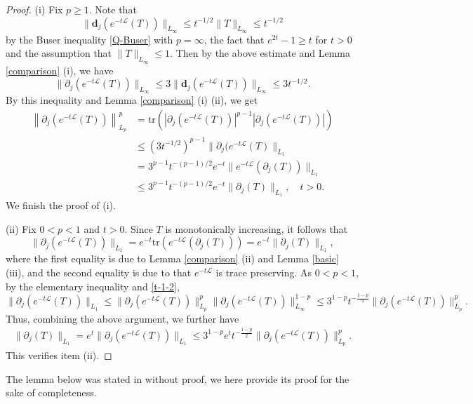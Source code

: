 \documentclass{amsbook}
\theoremstyle{definition}
\theoremstyle{remark}
\numberwithin{section}{chapter}
\numberwithin{equation}{chapter}
\newcommand{\1}{\mathbf{1}}
\newcommand{\La}{\mathcal{L}}
\newcommand{\dc}{\mathbf{d}}
\begin{document}
\begin{proof} (i) Fix $p\geq 1$.  Note that
$$
\|\dc_{j}(e^{-t\La}(T))\|_{L_{\infty}}\leq t^{-1/2}\|T\|_{L_{\infty}}\leq t^{-1/2}
$$
by the Buser inequality \eqref{Q-Buser} with \(p=\infty\), the fact that \(e^{2t}-1\geq t\) for \(t>0\) and the assumption that \(\|T\|_{L_\infty }\leq 1\). Then by the above estimate and Lemma \ref{comparison} (i), we have
\begin{equation}\label{t-1-2}
\|\partial_{j}(e^{-t\La}(T))\|_{L_{\infty}}\leq3\|\dc_{j}(e^{-t\La}(T))\|_{L_{\infty}}\leq 3t^{-1/2}.
\end{equation}	
By this inequality and  Lemma \ref{comparison} (i) (ii),  we get
\begin{align*}
\left\|\partial_{j}\left(e^{-t\La}(T)\right)\right\|_{L_{p}}^p&=\mathrm{tr}(|\partial_{j}(e^{-t\La}(T))|^{p-1}|\partial_{j}(e^{-t\La}(T))|)\\
&\leq (3t^{-1/2})^{p-1}\|\partial_{j}(e^{-t\La}(T)\|_{L_{1}}\\
&=3^{p-1}t^{-(p-1)/2}e^{-t}\|e^{-t\La}(\partial_{j}(T))\|_{L_{1}}\\
&\leq 3^{p-1}t^{-(p-1)/2}e^{-t}\|\partial_{j}(T)\|_{L_{1}},\quad t>0.
\end{align*}
We finish the proof of (i).
	
	(ii) Fix $0<p<1$ and $t>0$. Since $T$ is monotonically increasing, it follows that 
	$$\|\partial_{j}(e^{-t\La}(T))\|_{L_{1}}=e^{-t}\mathrm{tr}\left(e^{-t\La}\left(\partial_{j}(T)\right)\right)=e^{-t}\|\partial_{j}(T)\|_{L_{1}},$$
where the first equality is due to Lemma \ref{comparison} (ii) and Lemma \ref{basic} (iii), and the second equality is due to that $e^{-t\mathcal{L}}$ is trace preserving.  As $0<p<1$,  by the elementary inequality and \eqref{t-1-2},
\[
\|\partial_{j}(e^{-t\La}(T))\|_{L_{1}}\leq  	\|\partial_{j}(e^{-t\La}(T))\|^{p}_{L_{p}}\|\partial_{j}(e^{-t\La}(T))\|_{L_{\infty}}^{1-p}\leq 3^{1-p}t^{-\frac{1-p}{2}} \|\partial_{j}(e^{-t\La}(T))\|^{p}_{L_{p}} .
\]
Thus, combining the above argument, we further have
\begin{align*}
	\|\partial_{j}(T)\|_{L_{1}}= e^{t} \|\partial_{j}(e^{-t\La}(T))\|_{L_{1}}\leq 3^{1-p}e^t t^{-\frac{1-p}{2}} \|\partial_{j}(e^{-t\La}(T))\|^{p}_{L_{p}} .
\end{align*}
This verifies item (ii).
\end{proof}


The lemma below was stated in \cite{KMS2014} without proof, we here provide its proof for the sake of completeness. 
\end{document}
